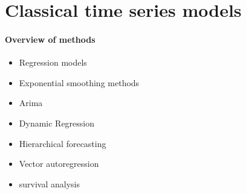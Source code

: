 \documentclass[12pt,a4paper]{article}
\begin{document}
\section{Classical time series models}
\paragraph{Overview of methods} 
\begin{itemize}
	\item Regression models
	\item Exponential smoothing methods
	\item Arima
	\item Dynamic Regression 
	\item Hierarchical forecasting
	\item Vector autoregression
	\item survival analysis
\end{itemize}
\end{document}
